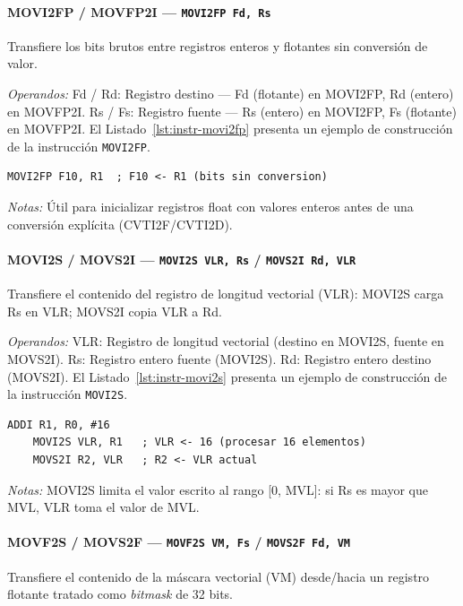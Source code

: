 \documentclass[../main.tex]{subfiles}
\begin{document}
\paragraph*{MOVI2FP / MOVFP2I --- \texttt{MOVI2FP Fd, Rs}}
Transfiere los bits brutos entre registros enteros y flotantes sin conversión de valor.

\textit{Operandos:} Fd / Rd: Registro destino --- Fd (flotante) en MOVI2FP, Rd (entero) en MOVFP2I. Rs / Fs: Registro fuente --- Rs (entero) en MOVI2FP, Fs (flotante) en MOVFP2I.
El Listado~\ref{lst:instr-movi2fp} presenta un ejemplo de construcción de la instrucción \texttt{MOVI2FP}.

\begin{lstlisting}[caption={MOVI2FP},label={lst:instr-movi2fp}]
	MOVI2FP F10, R1  ; F10 <- R1 (bits sin conversion)
\end{lstlisting}
\textit{Notas:} Útil para inicializar registros float con valores enteros antes de una conversión explícita (CVTI2F/CVTI2D).

\paragraph*{MOVI2S / MOVS2I --- \texttt{MOVI2S VLR, Rs} / \texttt{MOVS2I Rd, VLR}}
Transfiere el contenido del registro de longitud vectorial (VLR): MOVI2S carga Rs en VLR; MOVS2I copia VLR a Rd.

\textit{Operandos:} VLR: Registro de longitud vectorial (destino en MOVI2S, fuente en MOVS2I). Rs: Registro entero fuente (MOVI2S). Rd: Registro entero destino (MOVS2I).
El Listado~\ref{lst:instr-movi2s} presenta un ejemplo de construcción de la instrucción \texttt{MOVI2S}.

\begin{lstlisting}[caption={MOVI2S},label={lst:instr-movi2s}]
	ADDI R1, R0, #16
	MOVI2S VLR, R1   ; VLR <- 16 (procesar 16 elementos)
	MOVS2I R2, VLR   ; R2 <- VLR actual
\end{lstlisting}
\textit{Notas:} MOVI2S limita el valor escrito al rango [0, MVL]: si Rs es mayor que MVL, VLR toma el valor de MVL.

\paragraph*{MOVF2S / MOVS2F --- \texttt{MOVF2S VM, Fs} / \texttt{MOVS2F Fd, VM}}
Transfiere el contenido de la máscara vectorial (VM) desde/hacia un registro flotante tratado como \textit{bitmask} de 32 bits.
\end{document}
